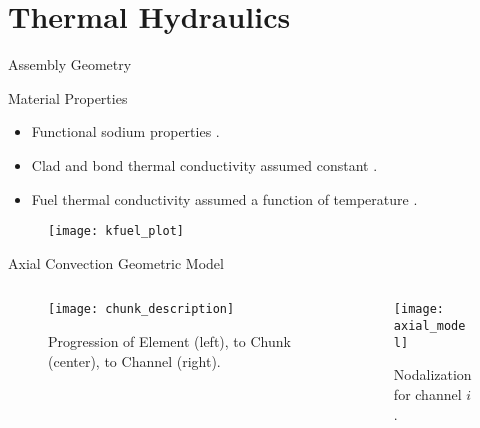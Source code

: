 \section{Thermal Hydraulics}
\label{sec:thermalHydraulics}

\begin{frame}{Assembly Geometry}
  \begin{figure}
    \centering
    \hspace{0.2in}
    \label{fig:assy_geometry}
  \end{figure}
\end{frame}

\begin{frame}{Material Properties}
  \begin{itemize}
    \item Functional sodium properties \cite{sodiumProp}.
    \item Clad and bond thermal conductivity assumed constant \cite{ht9Prop}.
    \item Fuel thermal conductivity assumed a function of temperature
      \cite{fuelProp}.
  \end{itemize}
  \begin{figure}
    \centering
    \texttt{[image: kfuel\_plot]}
    \label{fig:kfuel_plot}
  \end{figure}
\end{frame}

\begin{frame}{Axial Convection Geometric Model}
  \begin{columns}
    \begin{column}{0.5\textwidth}
      \begin{figure}
        \centering
        \texttt{[image: chunk\_description]}
        \caption{Progression of Element (left), to Chunk (center), to Channel
          (right).}
        \label{fig:chunk_description}
      \end{figure}
    \end{column}
    \begin{column}{0.5\textwidth}
      \begin{figure}
        \centering
        \texttt{[image: axial\_model]}
        \caption{Nodalization for channel $i$.}
        \label{fig:axial_model}
      \end{figure}
    \end{column}
  \end{columns}
\end{frame}


